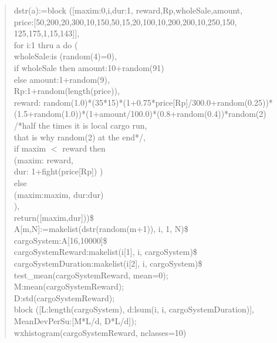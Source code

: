 \documentclass[]{article}
\begin{document}
\begin{quote}
	dstr(a):=block ([maxim:0,i,dur:1, reward,Rp,wholeSale,amount,\\
\hspace*{10mm}price:[50,200,20,300,10,150,50,15,20,100,10,200,200,10,250,150,\\
\hspace*{20mm}125,175,1,15,143]],\\
\hspace*{10mm}for i:1 thru a do (\\
\hspace*{20mm}wholeSale:is (random(4)=0),\\
\hspace*{30mm}if wholeSale then amount:10+random(91)\\
\hspace*{40mm} else amount:1+random(9),\\
\hspace*{50mm}Rp:1+random(length(price)),\\
\hspace*{20mm}reward: random(1.0)*(35*15)*(1+0.75*price[Rp]/300.0+random(0.25))*\\
\hspace*{30mm}(1.5+random(1.0))*(1+amount/100.0)*(0.8+random(0.4))*random(2)\\
\hspace*{40mm}/*half the times it is local cargo run,\\ 
\hspace*{50mm}that is why random(2) at the end*/,\\
\hspace*{20mm}if maxim $<$ reward then\\
\hspace*{40mm}(maxim: reward,\\
\hspace*{40mm}dur: 1+fight(price[Rp]) )\\
\hspace*{30mm}else\\
\hspace*{40mm}(maxim:maxim, dur:dur)\\
\hspace*{35mm}),\\
\hspace*{10mm}return([maxim,dur]))\$\\		
		
A[m,N]:=makelist(dstr(random(m+1)), i, 1, N)\$\\
cargoSystem:A[16,10000]\$\\
cargoSystemReward:makelist(i[1], i, cargoSystem)\$\\
cargoSystemDuration:makelist(i[2], i, cargoSystem)\$\\
test\_mean(cargoSystemReward, mean=0);\\
M:mean(cargoSystemReward);\\
D:std(cargoSystemReward);\\
block ([L:length(cargoSystem), d:lsum(i, i, cargoSystemDuration)],\\  
\hspace*{10mm}MeanDevPerSu:[M*L/d, D*L/d]);\\
wxhistogram(cargoSystemReward, nclasses=10)
\end{quote}
\end{document}
